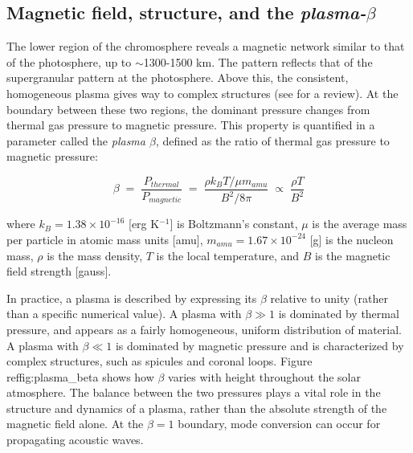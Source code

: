 



\newpage
\subsection{Magnetic field, structure, and the \textit{plasma-$\beta$}}



The lower region of the chromosphere reveals
a magnetic network similar to that of the photosphere, up to
$\sim$1300-1500 km. The pattern reflects that of the supergranular
pattern at the photosphere. Above this, the consistent, homogeneous
plasma gives way to complex structures (see \cite{Judge2006} for a
review). At the boundary between these two regions, the dominant
pressure changes from thermal gas pressure to magnetic pressure. This
property is quantified in a parameter called the \textit{plasma
$\beta$}, defined as the ratio of thermal gas pressure to magnetic
pressure:

\begin{equation}
    \beta \;=\; \frac{P_{thermal}}{P_{magnetic}}
    \;=\; \frac{\rho k_{B}T/\mu m_{amu}}{B^{2}/8\pi}
    \;\propto\; \frac{\rho T}{B^{2}}
\end{equation}

where $k_{B} = 1.38 \times 10^{-16}$ [erg K$^{-1}$] is Boltzmann's
constant, $\mu$ is the average mass per particle in atomic mass units
[amu], $m_{amu} = 1.67 \times 10^{-24}$ [g] is the nucleon mass, $\rho$
is the mass density, $T$ is the local temperature, and $B$ is the
magnetic field strength [gauss].

In practice, a plasma is described by expressing its $\beta$
relative to unity (rather than a specific numerical value). A plasma
with $\beta \gg 1$ is dominated by thermal pressure, and appears as a
fairly homogeneous, uniform distribution of material. A plasma with
$\beta \ll 1$ is dominated by magnetic pressure and is characterized
by complex structures, such as spicules and coronal loops.
Figure~\\ref{fig:plasma\_beta}
shows how $\beta$ varies with height
throughout the solar atmosphere. The balance between the two pressures
plays a vital role in the structure and dynamics of a plasma, rather
than the absolute strength of the magnetic field alone. At the
$\beta=1$ boundary, mode conversion can occur for propagating acoustic
waves.

